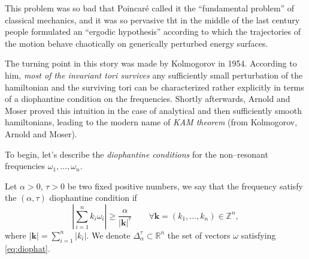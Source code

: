 \documentclass[english,fontsize=11pt,paper=a5,oneside]{scrbook}
\newcommand{\Z}{\mathbb{Z}}
\newcommand{\R}{\mathbb{R}}
\theoremstyle{definition}
\begin{document}
This problem was so bad that Poincar\'e called it the ``fundamental problem'' of classical mechanics, and it was so pervasive tht in the middle of the last century people formulated an ``ergodic hypothesis'' according to which the trajectories of the motion behave chaotically on generically perturbed energy surfaces.

The turning point in this story was made by Kolmogorov in 1954.
According to him, \emph{most of the invariant tori survives} any sufficiently small perturbation of the hamiltonian and the surviving tori can be characterized rather explicitly in terms of a diophantine condition on the frequencies.
Shortly afterwards, Arnold and Moser proved this intuition in the case of analytical and then sufficiently smooth hamiltonians,
leading to the modern name of \emph{KAM theorem} (from Kolmogorov, Arnold and Moser).

To begin, let's describe the \emph{diophantine conditions} for the non--resonant frequencies $\omega_1, \ldots, \omega_n$.

\begin{tcolorbox}
  Let $\alpha>0$, $\tau>0$ be two fixed positive numbers, we say that the frequency satisfy the $(\alpha,\tau)$ diophantine condition if
  \begin{equation}\label{eq:diophat}
    \left|\sum_{i=1}^n k_i \omega_i \right| \geq \frac{\alpha}{|\bm k|^\tau} \qquad \forall \bm k=(k_1, \ldots, k_n)\in\Z^n,
  \end{equation}
  where $|\bm k| = \sum_{i=1}^n |k_i|$.
  We denote $\Delta_\alpha^\tau\subset\R^n$ the set of vectors $\omega$ satisfying \eqref{eq:diophat}.
\end{tcolorbox}
\end{document}
